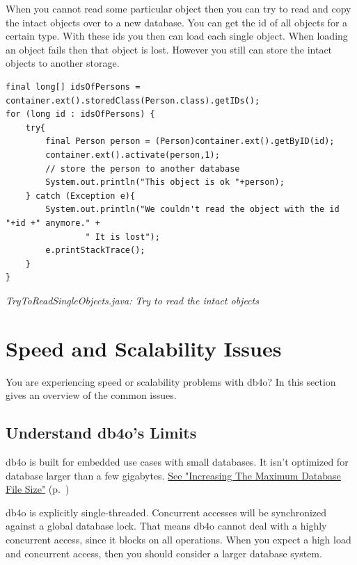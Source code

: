 When you cannot read some particular object then you can try to read and copy the intact objects over to a new database. You can get the id of all objects for a certain type. With these ids you then can load each single object. When loading an object fails then that object is lost. However you still can store the intact objects to another storage.

\begin{lstlisting}
final long[] idsOfPersons = container.ext().storedClass(Person.class).getIDs();
for (long id : idsOfPersons) {
    try{
        final Person person = (Person)container.ext().getByID(id);
        container.ext().activate(person,1);
        // store the person to another database
        System.out.println("This object is ok "+person);
    } catch (Exception e){
        System.out.println("We couldn't read the object with the id "+id +" anymore." +
                " It is lost");
        e.printStackTrace();
    }
}
\end{lstlisting}

{\small\itshape TryToReadSingleObjects.java: Try to read the intact objects\par}
\medskip

\section{Speed and Scalability Issues}
\label{ref:troubleshoot-speed-issues-html}

You are experiencing speed or scalability problems with db4o? In this section gives an overview of the common issues.

\subsection{Understand db4o's Limits}
\label{ref:troubleshoot-speed-issues-html:limits}

db4o is built for embedded use cases with small databases. It isn't optimized for database larger than a few gigabytes. \hyperref[ref:troubleshoot-increasing-the-maximum-database-file-size]{See "Increasing The Maximum Database File Size"} (p.~\pageref{ref:troubleshoot-increasing-the-maximum-database-file-size})

db4o is explicitly single-threaded. Concurrent accesses will be synchronized against a global database lock. That means db4o cannot deal with a highly concurrent access, since it blocks on all operations. When you expect a high load and concurrent access, then you should consider a larger database system.

